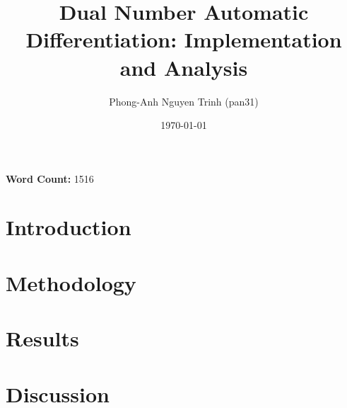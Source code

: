 \documentclass[11pt,a4paper]{article}
\title{Dual Number Automatic Differentiation: Implementation and Analysis}
\author{Phong-Anh Nguyen Trinh (pan31)}
\date{\today}
\begin{document}
\maketitle

\begin{center}
    \textbf{Word Count:} 1516
\end{center}

\section{Introduction}


\section{Methodology}


\section{Results}


\section{Discussion}




\end{document}
